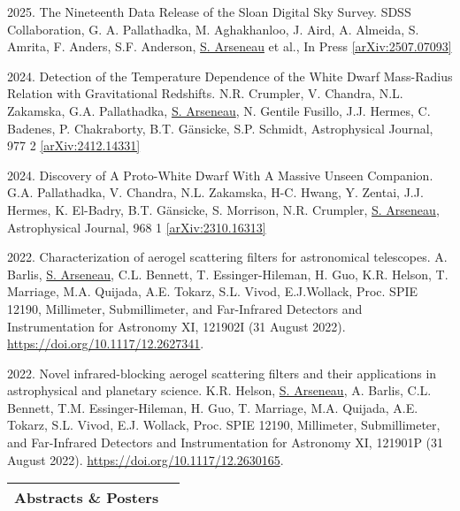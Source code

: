 \documentclass[letterpaper,11pt]{article}
\newenvironment{packed_enumerate}[1][]{
\begin{etaremune}[#1]
  \setlength{\itemsep}{3.7pt}
  \setlength{\parskip}{0pt}
  \setlength{\parsep}{0pt}}{\end{etaremune}
}
\begin{document}
\begin{packed_enumerate}
\item 2025. The Nineteenth Data Release of the Sloan Digital Sky Survey. SDSS Collaboration, G. A. Pallathadka, M. Aghakhanloo, J. Aird, A. Almeida, S. Amrita, F. Anders, S.F. Anderson, \underline{S. Arseneau} et al., In Press \href{https://https://arxiv.org/abs/2507.07093}{[arXiv:2507.07093]} 

\item 2024. Detection of the Temperature Dependence of the White Dwarf Mass-Radius Relation with Gravitational Redshifts. N.R. Crumpler, V. Chandra, N.L. Zakamska, G.A. Pallathadka, \underline{S. Arseneau}, N. Gentile Fusillo, J.J. Hermes, C. Badenes, P. Chakraborty, B.T. Gänsicke, S.P. Schmidt, Astrophysical Journal, 977 2 \href{https://arxiv.org/abs/2412.14331}{[arXiv:2412.14331]} 

\item 2024. Discovery of A Proto-White Dwarf With A Massive Unseen Companion. G.A. Pallathadka, V. Chandra, N.L. Zakamska, H-C. Hwang, Y. Zentai, J.J. Hermes, K. El-Badry, B.T. G\"ansicke, S. Morrison, N.R. Crumpler, \underline{S. Arseneau}, Astrophysical Journal, 968 1 \href{https://doi.org/10.48550/arXiv.2310.16313}{[arXiv:2310.16313]}

\item 2022. Characterization of aerogel scattering filters for astronomical telescopes. A. Barlis, \underline{S. Arseneau}, C.L. Bennett, T. Essinger-Hileman, H. Guo, K.R. Helson, T. Marriage, M.A. Quijada, A.E. Tokarz, S.L. Vivod, E.J.Wollack, Proc. SPIE 12190, Millimeter, Submillimeter, and Far-Infrared Detectors and Instrumentation for Astronomy XI, 121902I (31 August 2022). \href{https://doi.org/10.1117/12.2627341}{https://doi.org/10.1117/12.2627341}.

\item 2022. Novel infrared-blocking aerogel scattering filters and their applications in astrophysical and planetary science. K.R. Helson, \underline{S. Arseneau}, A. Barlis, C.L. Bennett, T.M. Essinger-Hileman, H. Guo, T. Marriage, M.A. Quijada, A.E. Tokarz, S.L. Vivod, E.J. Wollack, Proc. SPIE 12190, Millimeter, Submillimeter, and Far-Infrared Detectors and Instrumentation for Astronomy XI, 121901P (31 August 2022). \href{https://doi.org/10.1117/12.2630165}{https://doi.org/10.1117/12.2630165}.

\end{packed_enumerate}
\vspace{2.0mm}

\noindent
\begin{tabular*}{\textwidth}{l@{\extracolsep{\fill}}r}
\large {\sc \Large{Abstracts \& Posters}}  \\
\hline
\end{tabular*}\vspace{3.5mm}
\end{document}

